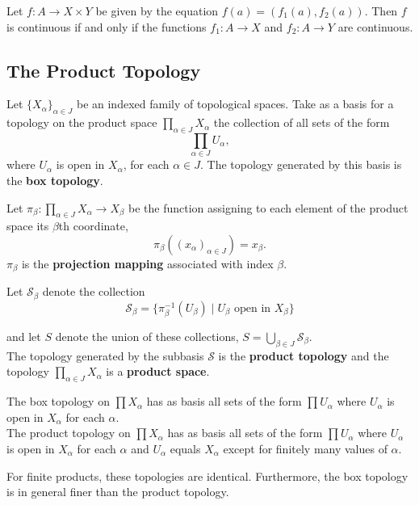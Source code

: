 \begin{theorem}
Let $f \colon A \rightarrow X \times Y$ be given by the equation $f(a) = (f_1(a), f_2(a))$. Then $f$ is continuous if and only if the functions
$f_1 \colon A \rightarrow X$ and $f_2\colon A \rightarrow Y$ are continuous.
\end{theorem}

\subsection{The Product Topology}

\begin{definition}
Let $\{ X_\alpha \}_{\alpha \in J}$ be an indexed family of topological spaces. Take as a basis for a topology on the product space $\prod _{\alpha \in J} X_\alpha$ the collection of all sets of the form
\[
    \prod_{\alpha \in J} U_\alpha,
\]
where $U_\alpha$ is open in $X_\alpha$, for each $\alpha \in J$. The topology generated by this basis is the \textbf{box topology}.
\end{definition}

\begin{definition}
Let $\pi_{\beta} \colon  \prod _{\alpha \in J} X_\alpha \rightarrow X_\beta$ be the function assigning to each element of the product space its $\beta$th coordinate, 
\[
    \pi _\beta((x_\alpha)_{\alpha \in J}) = x_\beta.
\]
$\pi_\beta$ is the \textbf{projection mapping} associated with index $\beta$.
\end{definition}

\begin{definition}
Let $\mathscr{S}_\beta$ denote the collection
\[
    \mathscr{S}_\beta = \{ \pi _\beta^{-1} (U_\beta) \mid U_\beta \text{ open in $X_\beta$}\} 
\]

and let $S$ denote the union of these collections, $S = \bigcup_{\beta \in J} \mathscr{S}_\beta$. \\

The topology generated by the subbasis $\mathscr{S}$ is the \textbf{product topology} and the topology $\prod_{\alpha \in J} X_\alpha$ is a \textbf{product space}. 
\end{definition}

\begin{theorem}
The box topology on $\prod X_\alpha$ has as basis all sets of the form $\prod  U_\alpha$ where $U_\alpha$ is open in $X_\alpha$ for each $\alpha$. \\

The product topology on $\prod X_\alpha$ has as basis all sets of the form $\prod  U_\alpha$ where $U_\alpha$ is open in $X_\alpha$ for each $\alpha$ and $U_\alpha$ equals $X_\alpha$ except for finitely many values of $\alpha$.
\end{theorem}

\begin{remark}
For finite products, these topologies are identical. Furthermore, the box topology is in general finer than the product topology.
\end{remark}